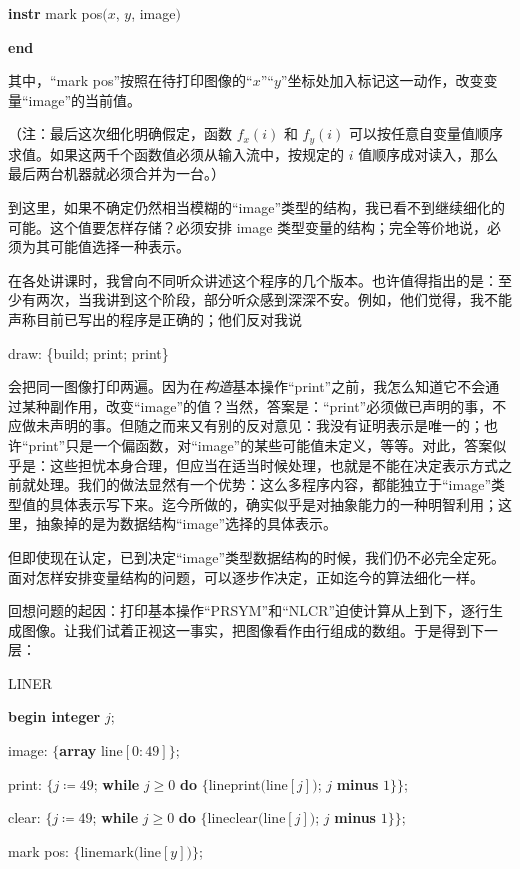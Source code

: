 \documentclass[twoside,11pt,fontset=none]{ctexbook}
\begin{document}
\quad\textbf{instr} mark pos$(x$, $y$, image$)$

\textbf{end}

\noindent
其中，“mark pos”按照在待打印图像的“$x$”“$y$”坐标处加入标记这一动作，改变变量“image”的当前值。

（注：最后这次细化明确假定，函数 $f_x(i)$ 和 $f_y(i)$ 可以按任意自变量值顺序求值。如果这两千个函数值必须从输入流中，按规定的 $i$ 值顺序成对读入，那么最后两台机器就必须合并为一台。）

到这里，如果不确定仍然相当模糊的“image”类型的结构，我已看不到继续细化的可能。这个值要怎样存储？必须安排 image 类型变量的结构；完全等价地说，必须为其可能值选择一种表示。

在各处讲课时，我曾向不同听众讲述这个程序的几个版本。也许值得指出的是：至少有两次，当我讲到这个阶段，部分听众感到深深不安。例如，他们觉得，我不能声称目前已写出的程序是正确的；他们反对我说

draw: \{build; print; print\}

\noindent
会把同一图像打印两遍。因为在\textit{构造}基本操作“print”之前，我怎么知道它不会通过某种副作用，改变“image”的值？当然，答案是：“print”必须做已声明的事，不应做未声明的事。但随之而来又有别的反对意见：我没有证明表示是唯一的；也许“print”只是一个偏函数，对“image”的某些可能值未定义，等等。对此，答案似乎是：这些担忧本身合理，但应当在适当时候处理，也就是不能在决定表示方式之前就处理。我们的做法显然有一个优势：这么多程序内容，都能独立于“image”类型值的具体表示写下来。迄今所做的，确实似乎是对抽象能力的一种明智利用；这里，抽象掉的是为数据结构“image”选择的具体表示。

但即使现在认定，已到决定“image”类型数据结构的时候，我们仍不必完全定死。面对怎样安排变量结构的问题，可以逐步作决定，正如迄今的算法细化一样。

回想问题的起因：打印基本操作“PRSYM”和“NLCR”迫使计算从上到下，逐行生成图像。让我们试着正视这一事实，把图像看作由行组成的数组。于是得到下一层：

LINER

\textbf{begin integer} $j$;

\quad image: $\{$\textbf{array} line$[0: 49]\}$;

\quad print: $\{j \coloneq 49$; \textbf{while} $j \geqslant 0$ \textbf{do} $\{$lineprint$($line$[j])$; $j$ \textbf{minus} $1\}\}$;

\quad clear: $\{j \coloneq 49$; \textbf{while} $j \geqslant 0$ \textbf{do} $\{$lineclear$($line$[j])$; $j$ \textbf{minus} $1\}\}$;

\quad mark pos: $\{$linemark$($line$[y])\}$;
\end{document}
